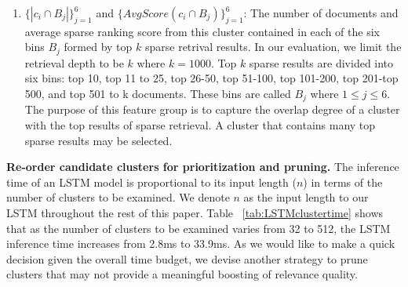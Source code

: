 \begin{enumerate}[leftmargin=*]
    \item $ \{  |c_i  \cap  B_j|    \}^{6}_{j=1} $ and $\{  AvgScore (c_i  \cap  B_j)    \}^{6}_{j=1} $: 
The number of documents and average sparse ranking score from this  cluster contained in each of   the six bins $B_j$  formed by
top $k$ sparse retrival results. In our evaluation, we limit the retrieval depth to be $k$ where $k = 1000$.
Top $k$ sparse results are divided into six bins:
top 10, top 11 to 25, top 26-50, top 51-100, top 101-200, top 201-top 500, and 
top 501 to k documents.  These bins are called $B_j$ where $1\leq j \leq 6$. 
The purpose of this feature group is to capture the overlap degree  of a cluster with the top results of sparse retrieval.
A cluster that contains many top sparse results may be selected.

\end{enumerate}



 

\textbf{Re-order candidate clusters for prioritization and pruning.} 
The inference time of an LSTM model is proportional to its input length ($n$) in terms of
the number of clusters to be examined. We denote $n$ as the  input length  to our LSTM  throughout the rest of this paper.
Table ~\ref{tab:LSTMclustertime} shows that as the number of clusters to be examined
varies from 32 to 512, the LSTM inference time increases from  2.8ms to 33.9ms.
As we would like to make a quick decision given the overall  time budget,
we devise another strategy to prune clusters that may not provide a meaningful boosting
of relevance quality. 


\begin{table}[h]
	\centering
	\caption{LSTM inference time with different input length.}
	\label{tab:LSTMclustertime}
 \vspace{-7mm} 
\end{table}

